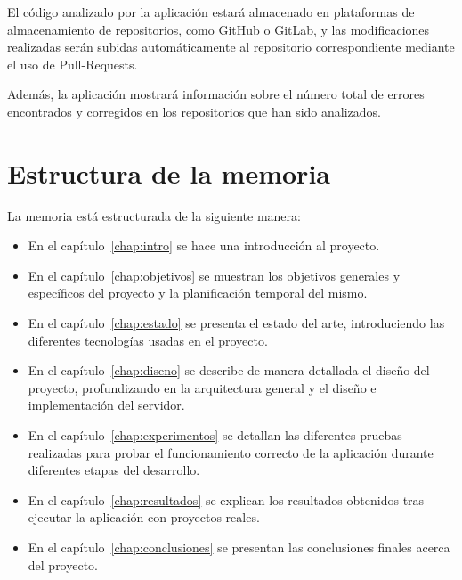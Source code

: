 \documentclass[a4paper, 12pt]{book}
\begin{document}
El código analizado por la aplicación estará almacenado en plataformas de almacenamiento de repositorios, como GitHub o GitLab, y las modificaciones realizadas serán subidas automáticamente al repositorio correspondiente mediante el uso de Pull-Requests.

Además, la aplicación mostrará información sobre el número total de errores encontrados y corregidos en los repositorios que han sido analizados.


\section{Estructura de la memoria}
\label{sec:estructura}

La memoria está estructurada de la siguiente manera:

\begin{itemize}
  \item En el capítulo~\ref{chap:intro} se hace una introducción al proyecto.
  \item En el capítulo~\ref{chap:objetivos} se muestran los objetivos generales y específicos del proyecto y la planificación temporal del mismo.
  \item En el capítulo~\ref{chap:estado} se presenta el estado del arte, introduciendo las diferentes tecnologías usadas en el proyecto.
  \item En el capítulo~\ref{chap:diseno} se describe de manera detallada el diseño del proyecto, profundizando en la arquitectura general y el diseño e implementación del servidor.
  \item En el capítulo~\ref{chap:experimentos} se detallan las diferentes pruebas realizadas para probar el funcionamiento correcto de la aplicación durante diferentes etapas del desarrollo.
  \item En el capítulo~\ref{chap:resultados} se explican los resultados obtenidos tras ejecutar la aplicación con proyectos reales. 
  \item En el capítulo~\ref{chap:conclusiones} se presentan las conclusiones finales acerca del proyecto.
\end{itemize}




\cleardoublepage %
\end{document}
